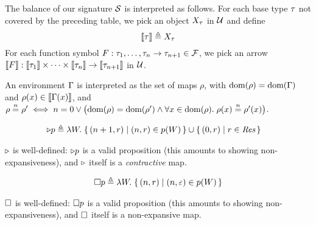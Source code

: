The balance of our signature $\mathcal{S}$ is interpreted as follows.
For each base type $\tau$ not covered by the preceding table, we pick an object $X_\tau$ in $\cal U$ and define
\[
\llbracket \tau \rrbracket \triangleq X_\tau
\]
For each function symbol $F : \tau_1, \dots, \tau_n \to \tau_{n+1} \in \mathcal{F}$, we pick an arrow $\llbracket F \rrbracket : \llbracket \tau_1 \rrbracket \times \dots \times \llbracket \tau_n \rrbracket \to \llbracket \tau_{n+1} \rrbracket$ in $\cal U$.

An environment $\Gamma$ is interpreted as the set of
maps $\rho$, with $\textrm{dom}(\rho) = \textrm{dom}(\Gamma)$ and
$\rho(x)\in\llbracket \Gamma(x) \rrbracket$,
and 
$\rho\nequiv{n} \rho' \iff n=0 \lor \bigl(\dom(\rho)=\dom(\rho') \land
\All x\in\dom(\rho). \rho(x) \nequiv{n} \rho'(x)\bigr)$.

%


\begin{align*}
	\later p &\eqdef \Lam W. \{\, (n + 1, r) \mid (n, r) \in p(W) \,\} \cup \{\, (0, r) \mid r \in \textdom{Res} \,\}
\end{align*}
\begin{lem}
	$\mathord{\triangleright}{}$ is well-defined: $\mathord{\triangleright} {p}$ is a valid proposition (this amounts to showing non-expansiveness), and $\mathord{\triangleright}{}$ itself is a \emph{contractive} map.
\end{lem}


\begin{align*}
	\always{p} \eqdef \Lam W. \{\, (n, r) \mid (n, \munit) \in p(W) \,\}
\end{align*}
\begin{lem}
	$\Box{}{}$ is well-defined: $\Box{}{p}$ is a valid proposition (this amounts to showing non-expansiveness), and $\Box{}{}$ itself is a non-expansive map.
\end{lem}



